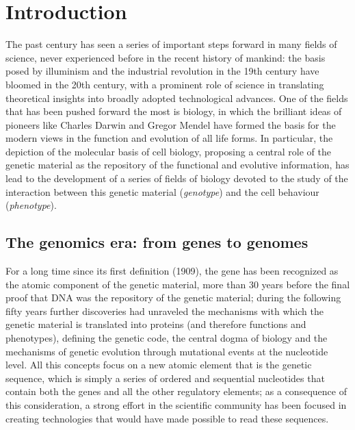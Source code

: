 \logvartrue
\chapter{Introduction}

The past century has seen a series of important steps forward in many fields of science, never experienced before in the recent history of mankind: the basis posed by illuminism and the industrial revolution in the 19th century have bloomed in the 20th century, with a prominent role of science in translating theoretical insights into broadly adopted technological advances. One of the fields that has been pushed forward the most is biology, in which the brilliant ideas of pioneers like Charles Darwin \cite{darwin1869origin} and Gregor Mendel \cite{mendel1865experiments} have formed the basis for the modern views in the function and evolution of all life forms. In particular, the depiction of the molecular basis of cell biology, proposing a central role of the genetic material as the repository of the functional and evolutive information, has lead to the development of a series of fields of biology devoted to the study of the interaction between this genetic material (\textit{genotype}) and the cell behaviour (\textit{phenotype}).  

\section{The genomics era: from genes to genomes}
For a long time since its first definition (1909), the gene has been recognized as the atomic component of the genetic material, more than 30 years before the final proof that DNA was the repository of the genetic material; during the following fifty years further discoveries had unraveled the mechanisms with which the genetic material is translated into proteins (and therefore functions and phenotypes), defining the genetic code, the central dogma of biology and the mechanisms of genetic evolution through mutational events at the nucleotide level. All this concepts focus on a new atomic element that is the genetic sequence, which is simply a series of ordered and sequential nucleotides that contain both the genes and all the other regulatory elements; as a consequence of this consideration, a strong effort in the scientific community has been focused in creating technologies that would have made possible to read these sequences.

